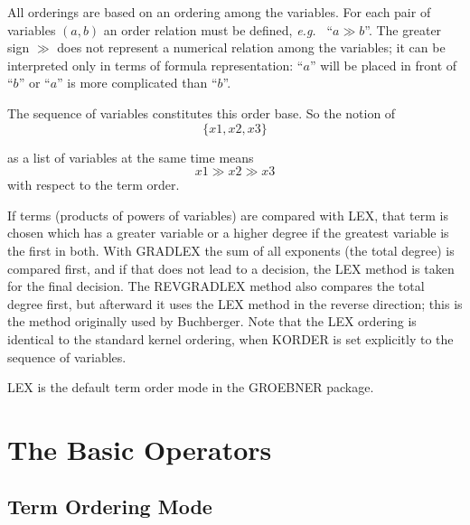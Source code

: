 All orderings are based on an ordering among the variables.  For each
pair of variables $(a,b)$ an order relation must be defined, {\em
e.g.\ } ``$ a\gg b $''.  The greater sign $\gg$  does not represent a
numerical relation among the variables; it can be interpreted only in
terms of formula representation: ``$a$'' will be placed in front of
``$b$'' or ``$a$''  is more complicated than ``$b$''.

The sequence of variables constitutes this order base.  So the notion
of
\[
\{x1,x2,x3\}
\]

as a list of variables at the same time means
\[
x1 \gg x2 \gg x3
\]
with respect to the term order.

If terms (products of powers of variables) are compared with LEX,
that term is chosen which has a greater variable or a higher degree
if the greatest variable is the first in both.  With GRADLEX the sum of
all exponents (the total degree) is compared first, and if that does
not lead to a decision, the LEX method is taken for the final decision.
The REVGRADLEX method also compares the total degree first, but
afterward it uses the LEX method in the reverse direction; this is the
method originally used by Buchberger.
Note that the LEX ordering is identical to the standard \REDUCE{}
kernel ordering, when KORDER is set explicitly to the sequence of
variables.

LEX is the default term order mode in the GROEBNER package.

\section{The Basic Operators}
\subsection{Term Ordering Mode}

